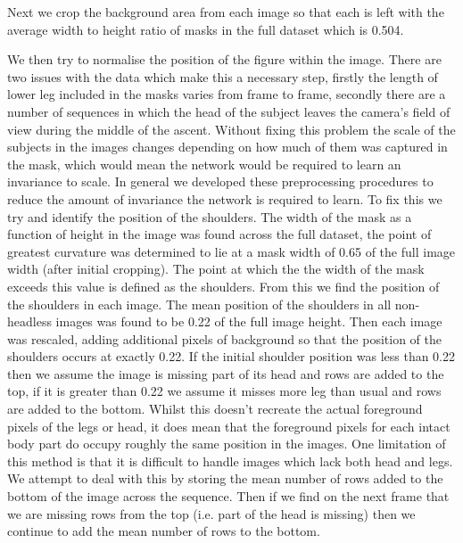 \documentclass[11pt]{article} %
\begin{document}
Next we crop the background area from each image so that each is left with the average width to height ratio of masks in the full dataset which is 0.504.

We then try to normalise the position of the figure within the image. There are two issues with the data which make this a necessary step, firstly the length of lower leg included in the masks varies from frame to frame, secondly there are a number of sequences in which the head of the subject leaves the camera's field of view during the middle of the ascent. Without fixing this problem the scale of the subjects in the images changes depending on how much of them was captured in the mask, which would mean the network would be required to learn an invariance to scale. In general we developed these preprocessing procedures to reduce the amount of invariance the network is required to learn. To fix this we try and identify the position of the shoulders. The width of the mask as a function of height in the image was found across the full dataset, the point of greatest curvature was determined to lie at a mask width of 0.65 of the full image width (after initial cropping). The point at which the the width of the mask exceeds this value is defined as the shoulders. From this we find the position of the shoulders in each image. The mean position of the shoulders in all non-headless images was found to be 0.22 of the full image height. Then each image was rescaled, adding additional pixels of background so that the position of the shoulders occurs at exactly 0.22. If the initial shoulder position was less than 0.22 then we assume the image is missing part of its head and rows are added to the top, if it is greater than 0.22 we assume it misses more leg than usual and rows are added to the bottom. Whilst this doesn't recreate the actual foreground pixels of the legs or head, it does mean that the foreground pixels for each intact body part do occupy roughly the same position in the images. One limitation of this method is that it is difficult to handle images which lack both head and legs. We attempt to deal with this by storing the mean number of rows added to the bottom of the image across the sequence. Then if we find on the next frame that we are missing rows from the top (i.e. part of the head is missing) then we continue to add the mean number of rows to the bottom.
\end{document}
